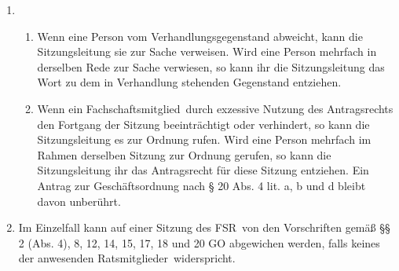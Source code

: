 \documentclass[a4paper, 12pt, ngerman]{article}
\newcommand{\rat}{FSR}
\newcommand{\rates}{FSR}
\newcommand{\go}{GO}
\newcommand{\mitglieder}{Ratsmitglieder}
\newcommand{\fsmitglied}{Fachschaftsmitglied}
\begin{document}
\begin{enumerate}[leftmargin=0cm]
\begin{enumerate}[leftmargin=0cm]
		\item Wird dem Antrag auf Schluss der Redeliste stattgegeben, so
		verliest die Sitzungsleitung die Namen der auf der Redeliste
		stehenden Personen und fragt nach weiteren Wortmeldungen.
		Die Redeliste wird dann geschlossen.
		\item Wird ein Antrag gemäß \cref{go.antrage} lit. j vertagt, so kann er erst wieder behandelt werden,
		falls dem \rat~mindestens vierundzwanzig Stunden vor Sitzungsbeginn ein schriftlicher,
		 begründeter Antrag zukommt. Die Einreichung per Mail ist dabei zulässig.
		\item Über Anträge nach \cref{go.antrage} lit. e ist umgehend und ohne Aussprache abzustimmen.
		\item Wird ein Antrag zur \go~abgelehnt, so darf er zu derselben Sache nicht von derselben Person
		wiederholt werden. 
		\item Im Ermessen der Sitzungsleitung kann ein Antrag zur GO auch dann als angenommen bzw. abgelehnt gelten, wenn die anwesenden \mitglieder~ihre Meinung durch Zuruf mehrheitlich kundtun. Anträge nach \cref{go.antrage} lit. b oder c bleiben hiervon unberührt.
	\end{enumerate}
	
	
	\item {}
	
	\begin{enumerate}[leftmargin=0cm]
		\item Wenn eine Person vom Verhandlungsgegenstand abweicht, kann die Sitzungsleitung sie zur Sache verweisen. Wird eine Person mehrfach in derselben Rede zur Sache verwiesen, so kann ihr die Sitzungsleitung das Wort zu dem in Verhandlung stehenden Gegenstand entziehen.
		\item Wenn ein \fsmitglied~durch exzessive Nutzung des Antragsrechts den Fortgang der Sitzung beeinträchtigt oder verhindert, so kann die Sitzungsleitung es zur Ordnung rufen. Wird eine Person mehrfach im Rahmen derselben Sitzung zur Ordnung gerufen, so kann die Sitzungsleitung ihr das Antragsrecht für diese Sitzung entziehen. Ein Antrag zur Geschäftsordnung nach § 20 Abs. 4 lit. a, b und d bleibt davon unberührt.
	\end{enumerate}
	
	\item {}
	
	Im Einzelfall kann auf einer Sitzung des \rates~von den Vorschriften gemäß %
	§§ 2 (Abs. 4), 8, 12, 14, 15, 17, 18 und 20 GO abgewichen werden, falls keines der anwesenden \mitglieder~widerspricht.
	

\end{enumerate}
\end{document}
